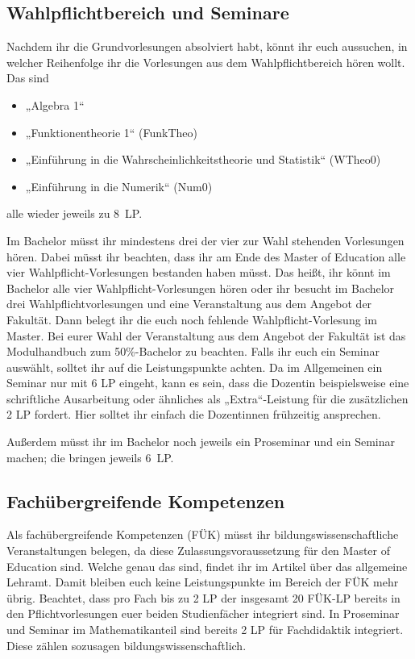 \subsection{Wahlpflichtbereich und Seminare}

Nachdem ihr die Grundvorlesungen absolviert habt, könnt ihr euch aussuchen, in welcher Reihenfolge ihr die Vorlesungen aus dem Wahlpflichtbereich hören wollt. Das sind
\begin{itemize}
  \item „Algebra 1“
  \item „Funktionentheorie 1“ (\gls{FunkTheo})
  \item „Einführung in die Wahrscheinlichkeitstheorie und Statistik“ (\gls{WTheo0})
  \item „Einführung in die Numerik“ (\gls{Num0})
\end{itemize}
alle wieder jeweils zu 8~\gls{LP}. 

Im Bachelor müsst ihr mindestens drei der vier zur Wahl stehenden Vorlesungen hören. Dabei müsst ihr beachten, dass ihr am Ende des Master of Education alle vier Wahlpflicht-Vorlesungen bestanden haben müsst. Das heißt, ihr könnt im Bachelor alle vier Wahlpflicht-Vorlesungen hören oder ihr besucht im Bachelor drei Wahlpflichtvorlesungen und eine Veranstaltung aus dem Angebot der Fakultät. Dann belegt ihr die euch noch fehlende Wahlpflicht-Vorlesung im Master. Bei eurer Wahl der Veranstaltung aus dem Angebot der Fakultät ist das Modulhandbuch zum 50\%-Bachelor zu beachten. Falls ihr euch ein Seminar auswählt, solltet ihr auf die Leistungspunkte achten. Da im Allgemeinen ein Seminar nur mit 6 \gls{LP} eingeht, kann es sein, dass die Dozentin beispielsweise eine schriftliche Ausarbeitung oder ähnliches als „Extra“-Leistung für die zusätzlichen 2 \gls{LP} fordert. Hier solltet ihr einfach die Dozentinnen frühzeitig ansprechen.

Außerdem müsst ihr im Bachelor noch jeweils ein Proseminar und ein Seminar machen; die bringen jeweils 6~\gls{LP}.

\subsection{Fachübergreifende Kompetenzen}

Als fachübergreifende Kompetenzen (FÜK) müsst ihr bildungswissenschaftliche Veranstaltungen belegen, da diese Zulassungsvoraussetzung für den Master of Education sind. Welche genau das sind, findet ihr im Artikel über das allgemeine Lehramt. Damit bleiben euch keine Leistungspunkte im Bereich der FÜK mehr übrig. Beachtet, dass pro Fach bis zu 2 \gls{LP} der insgesamt 20 FÜK-\gls{LP} bereits in den Pflichtvorlesungen euer beiden Studienfächer integriert sind. In Proseminar und Seminar im Mathematikanteil sind bereits 2 \gls{LP} für Fachdidaktik integriert. Diese zählen sozusagen bildungswissenschaftlich.

